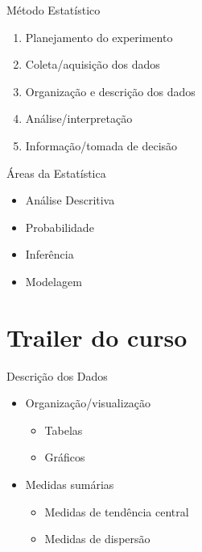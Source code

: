 \documentclass{beamer}
\begin{document}
\begin{frame}{Método Estatístico}
  \begin{enumerate}
  \item Planejamento do experimento
  \item Coleta/aquisição dos dados
  \item Organização e descrição dos dados
  \item Análise/interpretação
  \item Informação/tomada de decisão
  \end{enumerate}
\end{frame}

\begin{frame}{Áreas da Estatística}
  \begin{itemize}
  \item Análise Descritiva
  \item Probabilidade
  \item Inferência
  \item Modelagem
  \end{itemize}
\end{frame}

\section{Trailer do curso}

\begin{frame}{Descrição dos Dados}
  \begin{itemize}
  \item Organização/visualização
    \begin{itemize}
    \item Tabelas
    \item Gráficos
    \end{itemize}
  \item Medidas sumárias
    \begin{itemize}
    \item Medidas de tendência central
    \item Medidas de dispersão
    \end{itemize}
  \end{itemize}
\end{frame}
\end{document}
